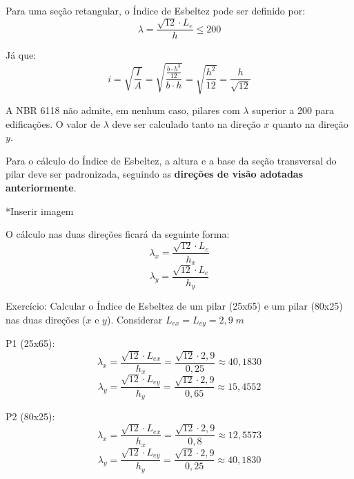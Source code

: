Para uma seção retangular, o Índice de Esbeltez pode ser definido por:
\begin{equation}\lambda=\frac{\sqrt{12}\cdot L_e}{h}\leqslant200\end{equation}

Já que: \begin{equation}i=\sqrt{\frac{I}{A}}=\sqrt{\frac{\frac{b\cdot h^3}{12}}{b\cdot h}}=\sqrt{\frac{h^2}{12}}=\frac{h}{\sqrt{12}}\end{equation}

A NBR 6118 não admite, em nenhum caso, pilares com $\lambda$ superior a 200 para edificações. O valor de $\lambda$ deve ser calculado tanto na direção $x$ quanto na direção $y$.

Para o cálculo do Índice de Esbeltez, a altura e a base da seção transversal do pilar deve ser padronizada, seguindo as \textbf{direções de visão adotadas anteriormente}.

*Inserir imagem

O cálculo nas duas direções ficará da seguinte forma:
\begin{equation}\lambda_x=\frac{\sqrt{12}\cdot L_e}{h_x}\end{equation}
\begin{equation}\lambda_y=\frac{\sqrt{12}\cdot L_e}{h_y}\end{equation}

Exercício: Calcular o Índice de Esbeltez de um pilar (25x65) e um pilar (80x25) nas duas direções ($x$ e $y$). Considerar $L_{ex}=L_{ey}=2,9\;m$

P1 (25x65):
$$\lambda_x=\frac{\sqrt{12}\cdot L_{ex}}{h_x}=\frac{\sqrt{12}\cdot2,9}{0,25}\approx40,1830$$
$$\lambda_y=\frac{\sqrt{12}\cdot L_{ey}}{h_y}=\frac{\sqrt{12}\cdot2,9}{0,65}\approx15,4552$$

P2 (80x25):
$$\lambda_x=\frac{\sqrt{12}\cdot L_{ex}}{h_x}=\frac{\sqrt{12}\cdot2,9}{0,8}\approx12,5573$$
$$\lambda_y=\frac{\sqrt{12}\cdot L_{ey}}{h_y}=\frac{\sqrt{12}\cdot2,9}{0,25}\approx40,1830$$